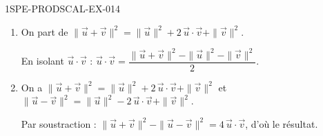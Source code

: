 \begin{corrige}{1SPE-PRODSCAL-EX-014}
\begin{enumerate}
\item On part de $\|\vec{u} + \vec{v}\|^2 = \|\vec{u}\|^2 + 2\,\vec{u} \cdot \vec{v} + \|\vec{v}\|^2$.

En isolant $\vec{u} \cdot \vec{v}$ :
$\vec{u} \cdot \vec{v} = \dfrac{\|\vec{u} + \vec{v}\|^2 - \|\vec{u}\|^2 - \|\vec{v}\|^2}{2}$.

\item On a $\|\vec{u} + \vec{v}\|^2 = \|\vec{u}\|^2 + 2\,\vec{u} \cdot \vec{v} + \|\vec{v}\|^2$ et $\|\vec{u} - \vec{v}\|^2 = \|\vec{u}\|^2 - 2\,\vec{u} \cdot \vec{v} + \|\vec{v}\|^2$.

Par soustraction : $\|\vec{u} + \vec{v}\|^2 - \|\vec{u} - \vec{v}\|^2 = 4\,\vec{u} \cdot \vec{v}$, d'où le résultat.
\end{enumerate}
\end{corrige}
